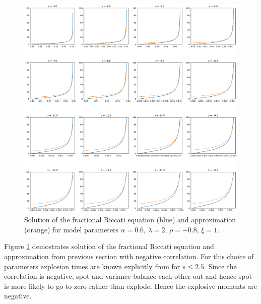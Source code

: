 \documentclass[12pt]{article}
\theoremstyle{plain}
\begin{document}
\begin{figure}[H]
    \centering
    \includegraphics[width=\textwidth]{figures/FractionalRiccatiApproximationNegativeCorrelation.pdf}
    \caption{Solution of the fractional Riccati equation (blue) and approximation (orange) for model parameters $\alpha=0.6$, $\lambda=2$, $\rho = -0.8$, $\xi = 1$.}
    \label{fig:FractionalRiccatiApproximationNegativeCorrelation}
\end{figure}

Figure \ref{fig:FractionalRiccatiApproximationNegativeCorrelation} demostrates solution of the fractional Riccati equation and approximation from previous section with negative correlation. For this choice of parameters explosion times are known explicitly from \cite{GGP18} for $s \leq 2.5$. Since the correlation is negative, spot and variance balance each other out and hence spot is more likely to go to zero rather than explode. Hence the explosive moments are negative.
\end{document}
